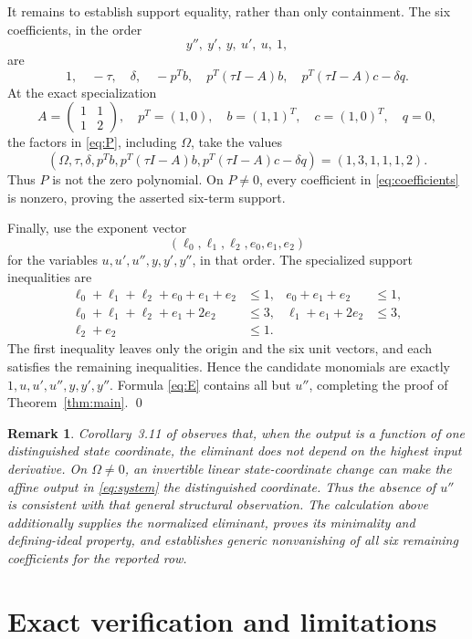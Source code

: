 \documentclass[11pt]{article}
\newtheorem{remark}[theorem]{Remark}
\begin{document}
It remains to establish support equality, rather than only containment.  The
six coefficients, in the order
\[
 y'',\ y',\ y,\ u',\ u,\ 1,
\]
are
\begin{equation}\label{eq:coefficients}
 1,\quad-\tau,\quad\delta,\quad-p^Tb,\quad
 p^T(\tau I-A)b,\quad p^T(\tau I-A)c-\delta q.
\end{equation}
At the exact specialization
\[
 A=\begin{pmatrix}1&1\\1&2\end{pmatrix},\quad
 p^T=(1,0),\quad b=(1,1)^T,\quad c=(1,0)^T,\quad q=0,
\]
the factors in \eqref{eq:P}, including \(\Omega\), take the values
\[
 (\Omega,\tau,\delta,p^Tb,p^T(\tau I-A)b,
 p^T(\tau I-A)c-\delta q)=(1,3,1,1,1,2).
\]
Thus \(P\) is not the zero polynomial.  On \(P\ne0\), every coefficient in
\eqref{eq:coefficients} is nonzero, proving the asserted six-term support.

Finally, use the exponent vector
\[
 (\ell_0,\ell_1,\ell_2,e_0,e_1,e_2)
\]
for the variables \(u,u',u'',y,y',y''\), in that order.  The specialized
support inequalities are
\begin{align*}
 \ell_0+\ell_1+\ell_2+e_0+e_1+e_2&\le1,&
 e_0+e_1+e_2&\le1,\\
 \ell_0+\ell_1+\ell_2+e_1+2e_2&\le3,&
 \ell_1+e_1+2e_2&\le3,\\
 \ell_2+e_2&\le1.&&
\end{align*}
The first inequality leaves only the origin and the six unit vectors, and
each satisfies the remaining inequalities.  Hence the candidate monomials
are exactly \(1,u,u',u'',y,y',y''\).  Formula \eqref{eq:E} contains all but
\(u''\), completing the proof of Theorem~\ref{thm:main}. \qed

\begin{remark}
Corollary~3.11 of \cite{JeronimoLanciano2026} observes that, when the output
is a function of one distinguished state coordinate, the eliminant does not
depend on the highest input derivative.  On \(\Omega\ne0\), an invertible
linear state-coordinate change can make the affine output in
\eqref{eq:system} the distinguished coordinate.  Thus the absence of
\(u''\) is consistent with that general structural observation.  The
calculation above additionally supplies the normalized eliminant, proves its
minimality and defining-ideal property, and establishes generic nonvanishing
of all six remaining coefficients for the reported row.
\end{remark}

\section{Exact verification and limitations}
\end{document}
